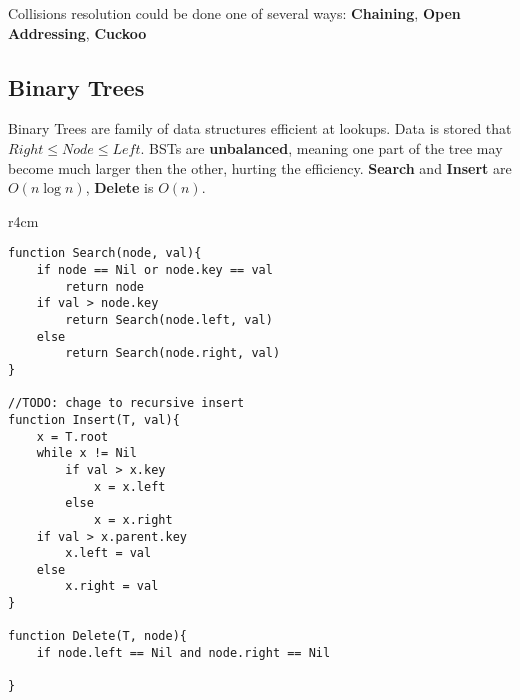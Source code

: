 \documentclass{article}
\begin{document}
Collisions resolution could be done one of several ways: {\bf Chaining}, {\bf Open Addressing}, {\bf Cuckoo}






\subsection{Binary Trees}
Binary Trees are family of data structures efficient at lookups. Data is stored that $Right \leq Node \leq Left$. BSTs are {\bf unbalanced}, meaning one part of the tree may become much larger then the other, hurting the efficiency. {\bf Search} and {\bf Insert} are $O(n \log n)$, {\bf Delete} is $O(n)$.

\begin{wrapfigure}{r}{4cm}
\end{wrapfigure}

\begin{lstlisting}[style=pseudo]
function Search(node, val){
	if node == Nil or node.key == val
		return node
	if val > node.key
		return Search(node.left, val)
	else
		return Search(node.right, val)
}

//TODO: chage to recursive insert
function Insert(T, val){
	x = T.root
	while x != Nil
		if val > x.key
			x = x.left
		else
			x = x.right
	if val > x.parent.key
		x.left = val
	else
		x.right = val
}

function Delete(T, node){
	if node.left == Nil and node.right == Nil

}
\end{lstlisting}

\end{document}
